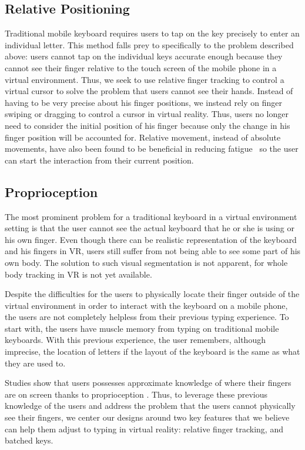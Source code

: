 \documentclass{sigchi}
\begin{document}
\subsection{Relative Positioning}
Traditional mobile keyboard requires users to tap on the key precisely to enter an individual letter.
This method falls prey to specifically to the problem described above: users cannot tap on the individual keys accurate enough because they cannot see their finger relative to the touch screen of the mobile phone in a virtual environment.
Thus, we seek to use relative finger tracking to control a virtual cursor to solve the problem that users cannot see their hands.
Instead of having to be very precise about his finger positions, we instead rely on finger swiping or dragging to control a cursor in virtual reality.
Thus, users no longer need to consider the initial position of his finger because only the change in his finger position will be accounted for. 
Relative movement, instead of absolute movements, have also been found to be beneficial in reducing fatigue~\cite{Hincapie-Ramos:2014:CEM:2556288.2557130} so the user can start the interaction from their current position.

\subsection{Proprioception}
The most prominent problem for a traditional keyboard in a virtual environment setting is that the user cannot see the actual keyboard that he or she is using or his own finger.
Even though there can be realistic representation of the keyboard and his fingers in VR, users still suffer from not being able to see some part of his own body.
The solution to such visual segmentation is not apparent, for whole body tracking in VR is not yet available.

Despite the difficulties for the users to physically locate their finger outside of the virtual environment in order to interact with the keyboard on a mobile phone, the users are not completely helpless from their previous typing experience.
To start with, the users have muscle memory from typing on traditional mobile keyboards. With this previous experience, the user remembers, although imprecise, the location of letters if the layout of the keyboard is the same as what they are used to.

Studies show that users possesses approximate knowledge of where their fingers are on screen thanks to proprioception \cite{boff1986handbook}.
Thus, to leverage these previous knowledge of the users and address the problem that the users cannot physically see their fingers, we center our designs around two key features that we believe can help them adjust to typing in virtual reality: relative finger tracking, and batched keys.
\end{document}
